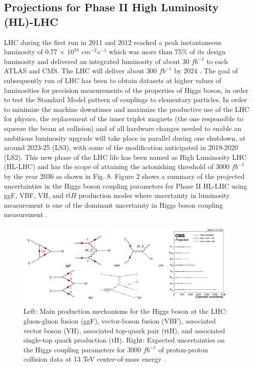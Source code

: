 \subsection{Projections for Phase II High Luminosity (HL)-LHC}
LHC during the first run in 2011 and 2012 reached a peak instantaneous luminosity of 0.77 $\times$ $10^{34}$ $cm^{-2}s^{-1}$ which was more than 75$\%$ of its design luminosity and delivered an integrated luminosity of about 30 $fb^{-1}$ to each ATLAS and CMS. The LHC will deliver about 300 $fb^{-1}$ by 2024 \cite{collaborations2019report}. The goal of subsequently run of LHC has been to obtain datasets at higher values of luminosities for precision measurements of the properties of Higgs boson, in order to test the Standard Model pattern of couplings to elementary particles. In order to minimize the machine downtimes and maximize the productive use of the LHC for physics, the replacement of the inner triplet magnets (the one responsible to squeeze the beam at collision) and  of  all  hardware  changes  needed  to  enable  an  ambitious  luminosity  upgrade  will  take  place in parallel during one shutdown, at around 2023-25 (LS3), with some of the modification anticipated in 2019-2020 (LS2). This new phase of the LHC life has been named as High Luminosity LHC (HL-LHC) and has the scope of attaining the astonishing threshold of 3000 $fb^{-1}$ by the year 2036 as shown in Fig. 8. Figure 2 shows a summary of the projected uncertainties in the Higgs boson coupling parameters for Phase II HL-LHC using ggF, VBF, VH, and ${t\bar{t}H}$ production modes where uncertainty in luminosity measurement is one of the dominant uncertainty in Higgs boson coupling measurement \cite{Tanabashi:2018oca}. \\





\begin{figure}[H]
  \centering
  \includegraphics[width=1 \columnwidth]{./hig_pro.png}
  \caption{\onehalfspacing Left: Main production mechanisms for the Higgs boson at the LHC: gluon-gluon fusion (ggF), vector-boson fusion (VBF), associated vector boson (VH), associated top-quark pair (ttH), and associated single-top quark production (tH). Right: Expected uncertainties on the Higgs coupling parameters for 3000 $fb^{-1}$ of proton-proton collision data at 13 TeV center-of-mass energy \cite{Tanabashi:2018oca}.}
  \label{fig:LHC}
\end{figure}

\clearpage\newpage

